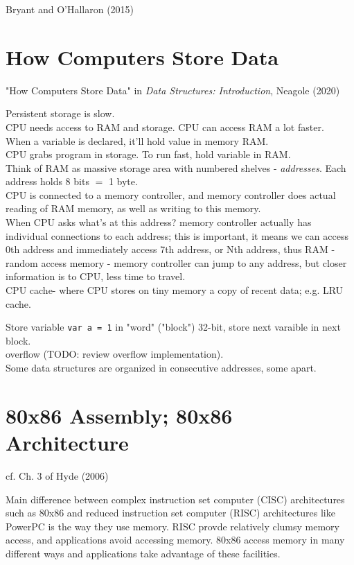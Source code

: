 \documentclass[10pt]{amsart}
\begin{document}
\begin{multicols*}{2}
Bryant and O'Hallaron (2015) \cite{BrOH2016}

\section{How Computers Store Data}

"How Computers Store Data" in \emph{Data Structures: Introduction}, Neagole (2020) \cite{Neag2020}

Persistent storage is slow. \\
CPU needs access to RAM and storage. CPU can access RAM a lot faster. \\
When a variable is declared, it'll hold value in memory RAM. \\
CPU grabs program in storage. To run fast, hold variable in RAM. \\ 
Think of RAM as massive storage area with numbered shelves - \emph{addresses}. Each address holds 8 bits $=$ 1 byte. \\
CPU is connected to a memory controller, and memory controller does actual reading of RAM memory, as well as writing to this memory. \\
When CPU asks what's at this address? memory controller actually has individual connections to each address; this is important, it means we can access 0th address and immediately access 7th address, or Nth address, thus RAM - random access memory - memory controller can jump to any address, but closer information is to CPU, less time to travel. \\
CPU cache- where CPU stores on tiny memory a copy of recent data; e.g. LRU cache.

Store variable \verb|var a = 1| in "word" ("block") 32-bit, store next varaible in next block. \\
overflow (TODO: review overflow implementation). \\
Some data structures are organized in consecutive addresses, some apart.

\section{80x86 Assembly; 80x86 Architecture}  

cf. Ch. 3 of Hyde (2006) \cite{Hyde2006}

Main difference between complex instruction set computer (CISC) architectures such as 80x86 and reduced instruction set computer (RISC) architectures like PowerPC is the way they use memory.  RISC provde relatively clumsy memory access, and applications avoid accessing memory.  80x86 access memory in many different ways and applications take advantage of these facilities.  


\end{multicols*}
\end{document}
